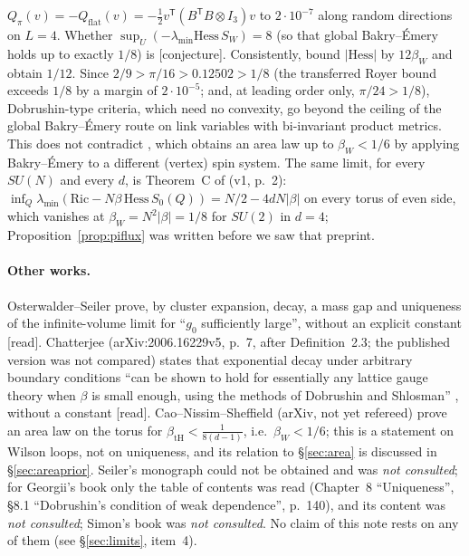 \documentclass[11pt,a4paper]{article}
\theoremstyle{remark}
\theoremstyle{definition}
\theoremstyle{plain}
\theoremstyle{remark}
\newcommand{\st}[1]{\textsf{[#1]}}
\begin{document}
$Q_\pi(v)=-Q_{\text{flat}}(v)=-\frac12v^{\mathsf T}(B^{\mathsf T}B\otimes I_3)v$ to $2\cdot10^{-7}$ along random directions
on $L=4$. Whether $\sup_U(-\lambda_{\min}\mathrm{Hess}\,S_W)=8$ (so that global Bakry--\'Emery holds up to exactly
$1/8$) is \st{conjecture}. Consistently, \cite{SZZ23} bound $|\mathrm{Hess}|$ by $12\beta_W$ and obtain $1/12$.
Since $2/9>\pi/16>0.12502>1/8$ (the transferred Royer bound exceeds $1/8$ by a margin of $2\cdot10^{-5}$; and,
at leading order only, $\pi/24>1/8$), Dobrushin-type criteria, which need no convexity, go beyond the ceiling of
the global Bakry--\'Emery route on link variables with bi-invariant product metrics. This does not contradict
\cite{CNS25}, which obtains an area law up to $\beta_W<1/6$ by applying Bakry--\'Emery to a different (vertex)
spin system. The same limit, for every $SU(N)$ and every $d$, is Theorem~C of \cite{BB26} (v1, p.~2):
$\inf_Q\lambda_{\min}(\mathrm{Ric}-N\beta\,\mathrm{Hess}\,S_0(Q))=N/2-4dN|\beta|$ on every torus of even side, which vanishes at $\beta_W=N^2|\beta|=1/8$
for $SU(2)$ in $d=4$; Proposition~\ref{prop:piflux} was written before we saw that preprint.

\paragraph{Other works.} Osterwalder--Seiler \cite{OS78} prove, by cluster expansion, decay, a mass gap and
uniqueness of the infinite-volume limit for ``$g_0$ sufficiently large'', without an explicit constant
\st{read}. Chatterjee \cite{Cha21} (arXiv:2006.16229v5, p.~7, after Definition~2.3; the published version was not
compared) states that exponential decay under arbitrary boundary conditions ``can be shown to hold for
essentially any lattice gauge theory when $\beta$ is small enough, using the methods of Dobrushin and Shlosman''
\cite{DS85}, without a constant \st{read}. Cao--Nissim--Sheffield
\cite{CNS25} (arXiv, not yet refereed) prove an area law on the torus for $\beta_{\mathrm{tH}}<\frac1{8(d-1)}$,
i.e.\ $\beta_W<1/6$; this is a statement on Wilson loops, not on uniqueness, and its relation to \S\ref{sec:area} is discussed in \S\ref{sec:areaprior}.
Seiler's monograph \cite{Sei82} could not be obtained and was \emph{not consulted}; for Georgii's book
\cite{Geo88} only the table of contents was read (Chapter~8 ``Uniqueness'', \S8.1 ``Dobrushin's condition of
weak dependence'', p.~140), and its content was \emph{not consulted}; Simon's book \cite{Sim93} was \emph{not
consulted}. No claim of this note rests on any of them (see \S\ref{sec:limits}, item~4).
\end{document}
